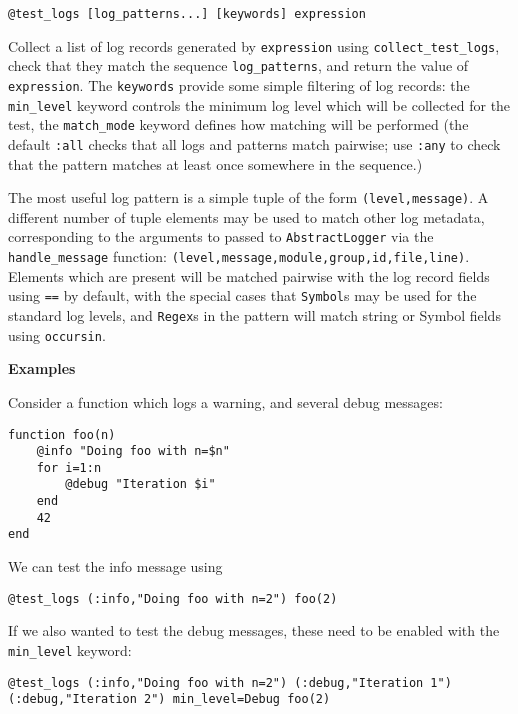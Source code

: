 \begin{adjustwidth}{2em}{0pt}


\begin{verbatim}
@test_logs [log_patterns...] [keywords] expression
\end{verbatim}

Collect a list of log records generated by \texttt{expression} using \texttt{collect\_test\_logs}, check that they match the sequence \texttt{log\_patterns}, and return the value of \texttt{expression}.  The \texttt{keywords} provide some simple filtering of log records: the \texttt{min\_level} keyword controls the minimum log level which will be collected for the test, the \texttt{match\_mode} keyword defines how matching will be performed (the default \texttt{:all} checks that all logs and patterns match pairwise; use \texttt{:any} to check that the pattern matches at least once somewhere in the sequence.)

The most useful log pattern is a simple tuple of the form \texttt{(level,message)}. A different number of tuple elements may be used to match other log metadata, corresponding to the arguments to passed to \texttt{AbstractLogger} via the \texttt{handle\_message} function: \texttt{(level,message,module,group,id,file,line)}. Elements which are present will be matched pairwise with the log record fields using \texttt{==} by default, with the special cases that \texttt{Symbol}s may be used for the standard log levels, and \texttt{Regex}s in the pattern will match string or Symbol fields using \texttt{occursin}.

\textbf{Examples}

Consider a function which logs a warning, and several debug messages:


\begin{lstlisting}
function foo(n)
    @info "Doing foo with n=$n"
    for i=1:n
        @debug "Iteration $i"
    end
    42
end
\end{lstlisting}

We can test the info message using


\begin{lstlisting}
@test_logs (:info,"Doing foo with n=2") foo(2)
\end{lstlisting}

If we also wanted to test the debug messages, these need to be enabled with the \texttt{min\_level} keyword:


\begin{lstlisting}
@test_logs (:info,"Doing foo with n=2") (:debug,"Iteration 1") (:debug,"Iteration 2") min_level=Debug foo(2)
\end{lstlisting}


\end{adjustwidth}
